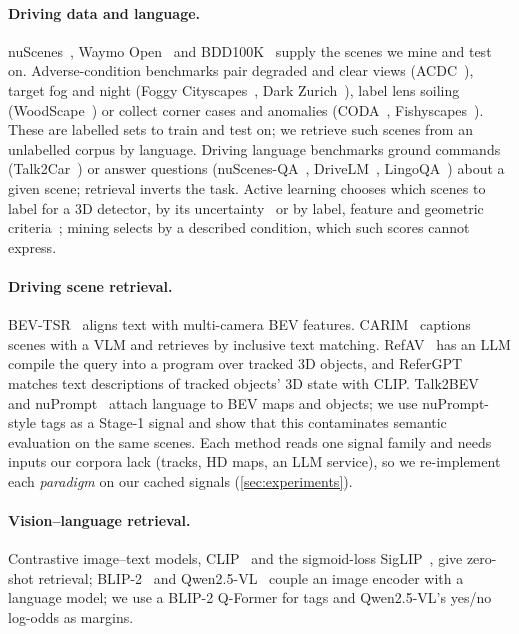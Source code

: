 \documentclass[10pt,twocolumn,letterpaper]{article}
\begin{document}
\paragraph{Driving data and language.} nuScenes~\cite{caesar2020nuscenes},
Waymo Open~\cite{sun2020waymo} and BDD100K~\cite{yu2020bdd} supply the scenes we
mine and test on. Adverse-condition benchmarks pair degraded and clear views
(ACDC~\cite{sakaridis2021acdc}), target fog and night (Foggy
Cityscapes~\cite{sakaridis2018foggy}, Dark Zurich~\cite{sakaridis2019darkzurich}),
label lens soiling (WoodScape~\cite{yogamani2019woodscape}) or collect corner cases
and anomalies (CODA~\cite{li2022coda}, Fishyscapes~\cite{blum2021fishyscapes}).
These are labelled sets to train and test on; we retrieve such scenes from an
unlabelled corpus by language. Driving language benchmarks ground commands
(Talk2Car~\cite{deruyttere2019talk2car}) or answer questions
(nuScenes-QA~\cite{qian2024nuscenesqa}, DriveLM~\cite{sima2024drivelm},
LingoQA~\cite{marcu2024lingoqa}) about a given scene; retrieval inverts the task. Active learning chooses which scenes to label for a 3D
detector, by its uncertainty~\cite{feng2019activelidar} or by label, feature and
geometric criteria~\cite{luo2023crb}; mining selects by a described condition,
which such scores cannot express.

\paragraph{Driving scene retrieval.} BEV-TSR~\cite{tang2025bevtsr} aligns text
with multi-camera BEV features. CARIM~\cite{ki2025carim} captions scenes with a VLM
and retrieves by inclusive text matching. RefAV~\cite{davidson2026refav} has an LLM
compile the query into a program over tracked 3D objects, and
ReferGPT~\cite{chamiti2025refergpt} matches text descriptions of tracked objects'
3D state with CLIP. Talk2BEV~\cite{choudhary2024talk2bev} and
nuPrompt~\cite{wu2023nuprompt} attach language to BEV maps and objects; we use
nuPrompt-style tags as a Stage-1 signal and show that this contaminates semantic
evaluation on the same scenes. Each method reads one signal family and needs inputs
our corpora lack (tracks, HD maps, an LLM service), so we re-implement each
\emph{paradigm} on our cached signals (\cref{sec:experiments}).

\paragraph{Vision--language retrieval.} Contrastive image--text models,
CLIP~\cite{radford2021clip} and the sigmoid-loss
SigLIP~\cite{zhai2023siglip,tschannen2025siglip2}, give zero-shot retrieval;
BLIP-2~\cite{li2023blip2} and Qwen2.5-VL~\cite{bai2025qwen25vl} couple an image
encoder with a language model; we use a BLIP-2 Q-Former for tags and Qwen2.5-VL's
yes/no log-odds as margins.
\end{document}
